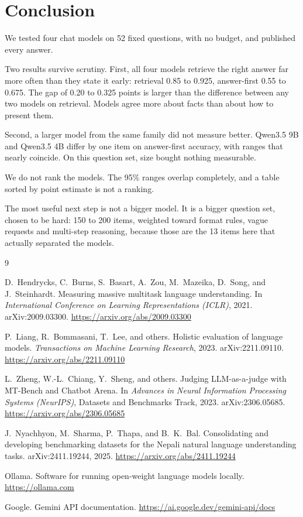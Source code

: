 \documentclass[11pt,a4paper]{article}
\begin{document}
\section{Conclusion}

We tested four chat models on 52 fixed questions, with no budget, and published every answer.

Two results survive scrutiny. First, all four models retrieve the right answer far more often than they state it early: retrieval 0.85 to 0.925, answer-first 0.55 to 0.675. The gap of 0.20 to 0.325 points is larger than the difference between any two models on retrieval. Models agree more about facts than about how to present them.

Second, a larger model from the same family did not measure better. Qwen3.5 9B and Qwen3.5 4B differ by one item on answer-first accuracy, with ranges that nearly coincide. On this question set, size bought nothing measurable.

We do not rank the models. The 95\% ranges overlap completely, and a table sorted by point estimate is not a ranking.

The most useful next step is not a bigger model. It is a bigger question set, chosen to be hard: 150 to 200 items, weighted toward format rules, vague requests and multi-step reasoning, because those are the 13 items here that actually separated the models.

\begin{thebibliography}{9}

D.~Hendrycks, C.~Burns, S.~Basart, A.~Zou, M.~Mazeika, D.~Song, and J.~Steinhardt.
\newblock Measuring massive multitask language understanding.
\newblock In \emph{International Conference on Learning Representations (ICLR)}, 2021.
\newblock arXiv:2009.03300. \url{https://arxiv.org/abs/2009.03300}

P.~Liang, R.~Bommasani, T.~Lee, and others.
\newblock Holistic evaluation of language models.
\newblock \emph{Transactions on Machine Learning Research}, 2023.
\newblock arXiv:2211.09110. \url{https://arxiv.org/abs/2211.09110}

L.~Zheng, W.-L.~Chiang, Y.~Sheng, and others.
\newblock Judging LLM-as-a-judge with MT-Bench and Chatbot Arena.
\newblock In \emph{Advances in Neural Information Processing Systems (NeurIPS)}, Datasets and Benchmarks Track, 2023.
\newblock arXiv:2306.05685. \url{https://arxiv.org/abs/2306.05685}

J.~Nyachhyon, M.~Sharma, P.~Thapa, and B.~K.~Bal.
\newblock Consolidating and developing benchmarking datasets for the Nepali natural language understanding tasks.
\newblock arXiv:2411.19244, 2025. \url{https://arxiv.org/abs/2411.19244}

Ollama.
\newblock Software for running open-weight language models locally.
\newblock \url{https://ollama.com}

Google.
\newblock Gemini API documentation.
\newblock \url{https://ai.google.dev/gemini-api/docs}

\end{thebibliography}
\end{document}
